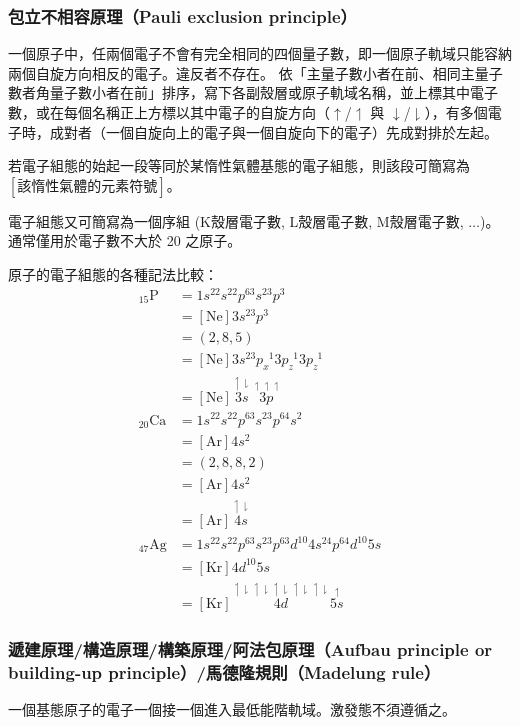 \documentclass[a4paper,12pt]{report}
\begin{document}
\subsubsection{包立不相容原理（Pauli exclusion principle）}
一個原子中，任兩個電子不會有完全相同的四個量子數，即一個原子軌域只能容納兩個自旋方向相反的電子。違反者不存在。
依「主量子數小者在前、相同主量子數者角量子數小者在前」排序，寫下各副殼層或原子軌域名稱，並上標其中電子數，或在每個名稱正上方標以其中電子的自旋方向（$\uparrow$/$\upharpoonleft$ 與 $\downarrow$/$\downharpoonright$），有多個電子時，成對者（一個自旋向上的電子與一個自旋向下的電子）先成對排於左起。

若電子組態的始起一段等同於某惰性氣體基態的電子組態，則該段可簡寫為$\left[\text{該惰性氣體的元素符號}\right]$。

電子組態又可簡寫為一個序組 (K殼層電子數, L殼層電子數, M殼層電子數, $\ldots$)。通常僅用於電子數不大於 20 之原子。

原子的電子組態的各種記法比較：
\[\begin{aligned}
_{15}\mathrm{P}&=1s^22s^22p^63s^23p^3\\
&=[\mathrm{Ne}]3s^23p^3\\
&=(2,8,5)\\
&=[\mathrm{Ne}]3s^23p_x^{\phantom{x}1}3p_z^{\phantom{y}1}3p_z^{\phantom{z}1}\\
&=[\mathrm{Ne}]\overset{\upharpoonleft\downharpoonright}{3s}\overset{\upharpoonleft\upharpoonleft\upharpoonleft}{3p}\\
_{20}\mathrm{Ca}&=1s^22s^22p^63s^23p^64s^2\\
&=[\mathrm{Ar}]4s^2\\
&=(2,8,8,2)\\
&=[\mathrm{Ar}]4s^2\\
&=[\mathrm{Ar}]\overset{\upharpoonleft\downharpoonright}{4s}\\
_{47}\mathrm{Ag}&=1s^22s^22p^63s^23p^63d^{10}4s^24p^64d^{10}5s\\
&=[\mathrm{Kr}]4d^{10}5s\\
&=[\mathrm{Kr}]\overset{\upharpoonleft\downharpoonright\upharpoonleft\downharpoonright\upharpoonleft\downharpoonright\upharpoonleft\downharpoonright\upharpoonleft\downharpoonright}{4d}\overset{\upharpoonleft}{5s}
\end{aligned}\]
\subsubsection{遞建原理/構造原理/構築原理/阿法包原理（Aufbau principle or building-up principle）/馬德隆規則（Madelung rule）}
一個基態原子的電子一個接一個進入最低能階軌域。激發態不須遵循之。
\end{document}

